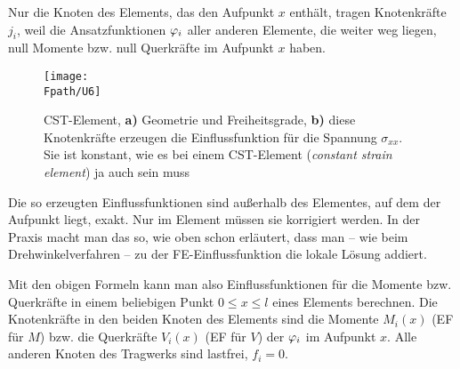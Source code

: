 \begin{example}
Nur die Knoten des Elements, das den Aufpunkt $x$ enth\"{a}lt, tragen Knotenkr\"{a}fte $j_i$, weil die Ansatzfunktionen $\varphi_i$ aller anderen Elemente, die weiter weg liegen, null Momente bzw. null Querkr\"{a}fte im Aufpunkt $x$ haben.
\begin{figure}[tbp]
\centering
\if {} \sidecaption[t] \fi
\texttt{[image: \\Fpath/U6]}
\caption{CST-Element,  \textbf{ a)} Geometrie und Freiheitsgrade,  \textbf{ b)} diese Knotenkr\"{a}fte erzeugen die Einflussfunktion f\"{u}r die Spannung $\sigma_{xx}$. Sie ist konstant,  wie es bei einem CST-Element ({\em constant strain element\/})  ja auch sein muss}
\label{U6}
\end{figure}%

Die so erzeugten Einflussfunktionen sind au{\ss}erhalb des Elementes, auf dem der Aufpunkt liegt, exakt. Nur im Element m\"{u}ssen sie korrigiert werden. In der Praxis macht man das so, wie oben schon erl\"{a}utert, dass man -- wie beim Drehwinkelverfahren -- zu der FE-Einflussfunktion die lokale L\"{o}sung addiert.

Mit den obigen Formeln kann man also Einflussfunktionen f\"{u}r die Momente bzw. Querkr\"{a}fte in einem beliebigen Punkt $0 \leq x \leq l$ eines Elements berechnen. Die Knotenkr\"{a}fte in den beiden Knoten des Elements sind die Momente $M_i(x)$ (EF f\"{u}r $M$) bzw. die Querkr\"{a}fte $V_i(x)$ (EF f\"{u}r $V$) der $\varphi_i$ im Aufpunkt $x$. Alle anderen Knoten des Tragwerks sind lastfrei, $f_i = 0$.
\end{example}


